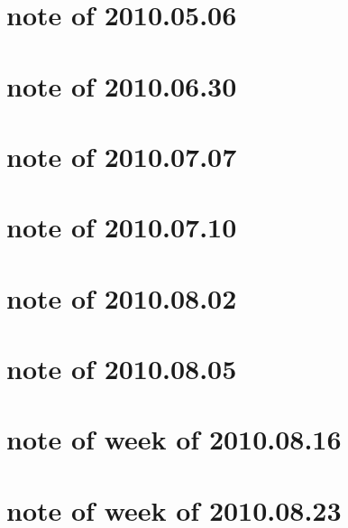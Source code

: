 \documentclass{article}
\begin{document}
\section{note of 2010.05.06}

\section{note of 2010.06.30}


\section{note of 2010.07.07}

\section{note of 2010.07.10}


\section{note of 2010.08.02}

\section{note of 2010.08.05}

\section{note of week of 2010.08.16}

\section{note of week of 2010.08.23}



\end{document}
